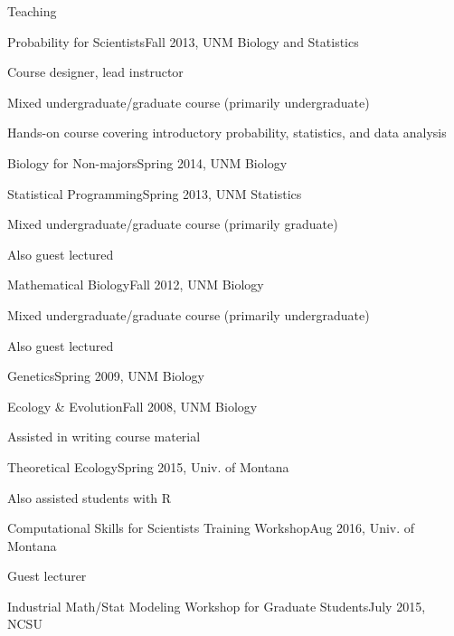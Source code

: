 \documentclass{resume} %
\begin{document}
\begin{rSection}{Teaching}
\begin{rSubsection}{Probability for Scientists}{Fall 2013, UNM Biology and Statistics}{}{}
\item Course designer, lead instructor
\item Mixed undergraduate/graduate course (primarily undergraduate)
\item Hands-on course covering introductory probability, statistics, and data analysis
\end{rSubsection}
\begin{rSubsection}{Biology for Non-majors}{Spring 2014, UNM Biology}{}{}
\nullitem
\end{rSubsection}
\begin{rSubsection}{Statistical Programming}{Spring 2013, UNM Statistics}{}{}
\item Mixed undergraduate/graduate course (primarily graduate)
\item Also guest lectured
\end{rSubsection}
\begin{rSubsection}{Mathematical Biology}{Fall 2012, UNM Biology}{}{}
\item Mixed undergraduate/graduate course (primarily undergraduate)
\item Also guest lectured
\end{rSubsection}
\begin{rSubsection}{Genetics}{Spring 2009, UNM Biology}{}{}
\nullitem
\end{rSubsection}
\begin{rSubsection}{Ecology \& Evolution}{Fall 2008, UNM Biology}{}{}
\item Assisted in writing course material
\end{rSubsection}
\begin{rSubsection}{Theoretical Ecology}{Spring 2015, Univ. of Montana}{}{}
\item Also assisted students with R
\end{rSubsection}
\begin{rSubsection}{Computational Skills for Scientists Training Workshop}{Aug 2016, Univ. of Montana}{}{}
\item Guest lecturer
\end{rSubsection}
\begin{rSubsection}{Industrial Math/Stat Modeling Workshop for Graduate Students}{July 2015, NCSU}{}{}

\end{rSubsection}
\end{rSection}
\end{document}
